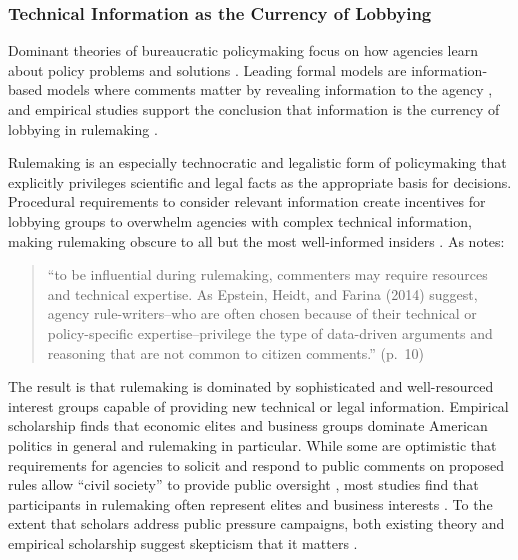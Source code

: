 \documentclass[
      12pt,
        ]{article}
\begin{document}
\hypertarget{technical-information-as-the-currency-of-lobbying}{%
\subsubsection{Technical Information as the Currency of Lobbying}\label{technical-information-as-the-currency-of-lobbying}}

Dominant theories of bureaucratic policymaking focus on how agencies learn about policy problems and solutions \citep{Kerwin2011}. Leading formal models are information-based models where comments matter by revealing information to the agency \citep{Gailmard2017, Libgober2018}, and empirical studies support the conclusion that information is the currency of lobbying in rulemaking \citep{Yackee2012, Cook2017, Gordon2018, Walters2019}.

Rulemaking is an especially technocratic and legalistic form of policymaking that explicitly privileges scientific and legal facts as the appropriate basis for decisions. Procedural requirements to consider relevant information create incentives for lobbying groups to overwhelm agencies with complex technical information, making rulemaking obscure to all but the most well-informed insiders \citep{Wagner2010}.
As \citet{Yackee2019} notes:

\begin{quote}
``to be influential during rulemaking,
commenters may require resources and technical expertise.
As Epstein, Heidt, and Farina (2014) suggest, agency rule-writers--who are often chosen because
of their technical or policy-specific expertise--privilege the type of data-driven
arguments and reasoning that are not common to citizen comments.'' (p.~10)
\end{quote}

The result is that rulemaking is dominated by sophisticated and well-resourced interest groups capable of providing new technical or legal information. Empirical scholarship finds that economic elites and business groups
dominate American politics in general \citetext{\citealp{Jacobs2005}; \citealp{Soss2007}; \citealp[Hertel-Fernandez2019;][]{Hacker2003}; \citealp{Gilens2014}} and rulemaking in
particular. While some are optimistic that requirements for agencies to
solicit and respond to public comments on proposed rules allow ``civil
society'' to provide public oversight \citep{Michaels2015, Metzger2010}, most
studies find that participants in rulemaking often represent elites and
business interests \citep{Seifter2016UCLA, Crow2015, Wagner2011, West2009, Yackee2006JOP, Yackee2006JPART, Golden1998, Haeder2015, Cook2017, LibgoberCarpenter2018}. To the extent that scholars address public pressure campaigns, both
existing theory and empirical scholarship suggest skepticism that it
matters \citep{Balla2018}.
\end{document}
